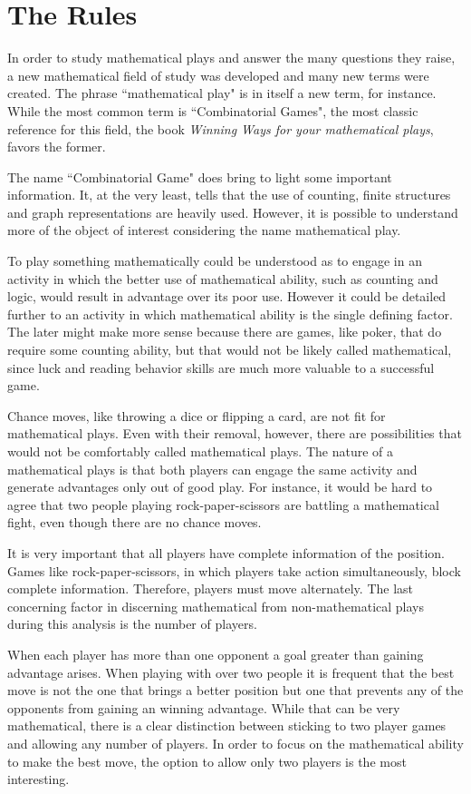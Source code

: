 \section*{The Rules}

In order to study mathematical plays and answer the many questions they raise, a new mathematical field of study was developed and many new terms were created. The phrase ``mathematical play" is in itself a new term, for instance. While the most common term is ``Combinatorial Games", the most classic reference for this field, the book \textit{Winning Ways for your mathematical plays}, favors the former.

The name ``Combinatorial Game" does bring to light some important information. It, at the very least, tells that the use of counting, finite structures and graph representations are heavily used. However, it is possible to understand more of the object of interest considering the name mathematical play.

To play something mathematically could be understood as to engage in an activity in which the better use of mathematical ability, such as counting and logic, would result in advantage over its poor use. However it could be detailed further to an activity in which mathematical ability is the single defining factor. The later might make more sense because there are games, like poker, that do require some counting ability, but that would not be likely called mathematical, since luck and reading behavior skills are much more valuable to a successful game.

Chance moves, like throwing a dice or flipping a card, are not fit for mathematical plays. Even with their removal, however, there are possibilities that would not be comfortably called mathematical plays. The nature of a mathematical plays is that both players can engage the same activity and generate advantages only out of good play. For instance, it would be hard to agree that two people playing rock-paper-scissors are battling a mathematical fight, even though there are no chance moves.

It is very important that all players have complete information of the position. Games like rock-paper-scissors, in which players take action simultaneously, block complete information. Therefore, players must move alternately. The last concerning factor in discerning mathematical from non-mathematical plays during this analysis is the number of players.

When each player has more than one opponent a goal greater than gaining advantage arises. When playing with over two people it is frequent that the best move is not the one that brings a better position but one that prevents any of the opponents from gaining an winning advantage. While that can be very mathematical, there is a clear distinction between sticking to two player games and allowing any number of players. In order to focus on the mathematical ability to make the best move, the option to allow only two players is the most interesting.

